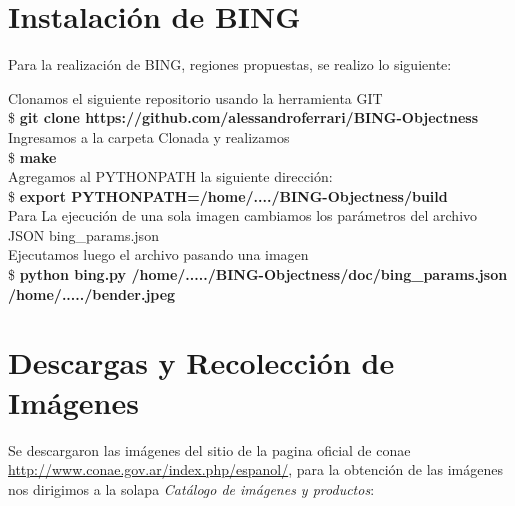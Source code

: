 
\section{Instalación de BING}
Para la realización de BING, regiones propuestas, se realizo lo siguiente:

Clonamos el siguiente repositorio usando la herramienta GIT\\
\$\textbf{ git clone https://github.com/alessandroferrari/BING-Objectness}
Ingresamos a la carpeta Clonada y realizamos \\
\$ \textbf{make} \\
Agregamos al PYTHONPATH la siguiente dirección:\\
\$ \textbf{export PYTHONPATH=/home/..../BING-Objectness/build} \\

Para La ejecución de una sola imagen cambiamos los parámetros del archivo JSON bing\_params.json \\
Ejecutamos luego el archivo pasando una imagen\\
\$ \textbf{python bing.py /home/...../BING-Objectness/doc/bing\_params.json /home/...../bender.jpeg}

\section{Descargas y Recolección de Imágenes}
Se descargaron las imágenes del sitio de la pagina oficial de \ac{conae} \url{http://www.conae.gov.ar/index.php/espanol/}, para la obtención de las imágenes nos dirigimos a
la solapa \textit{Catálogo de imágenes y productos}:

